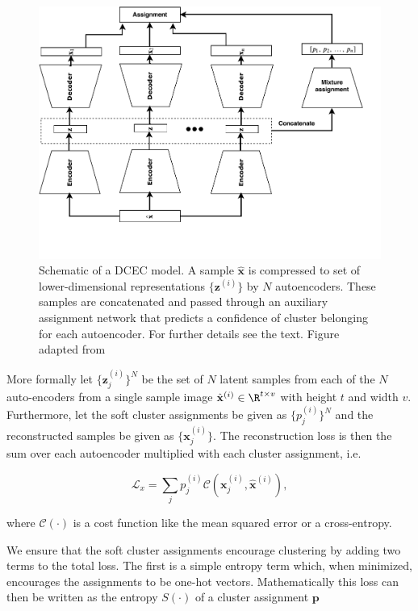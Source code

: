 \begin{figure}[tb]
	\centering
	\includegraphics[width=\textwidth]{plots/mixae.pdf}
	\caption[Deep convolutional embedded clustering schematic]{Schematic of a DCEC model. A sample $\hat{\mathbf{x}}$ is compressed to set of lower-dimensional representations $\{\mathbf{z}^{(i)}\}$ by $N$ autoencoders. These samples are concatenated and passed through an auxiliary assignment network that predicts a confidence of cluster belonging for each autoencoder. For further details see the text. Figure adapted from \citet{Zhang}}
	\label{fig:mixae}
\end{figure}


More formally let $\{\mathbf{z}_j^{(i)}\}^N$ be the set of $N$ latent samples from each of the $N$ auto-encoders from a single sample image $\hat{\mathbf{x}}^{(i)} \in \R ^{t\times v}$ with height $t$ and width $v$. Furthermore, let the soft cluster assignments be given as $\{p_j^{(i)}\}^N$ and the reconstructed samples be given as $\{\mathbf{x}_j^{(i)}\}$. The reconstruction loss is then the sum over each autoencoder multiplied with each cluster assignment, i.e.

\begin{equation}\label{eq:mixae_reconst}
\mathcal{L}_x = \sum_j p_j^{(i)} \mathcal{C}(\mathbf{x}_j^{(i)}, \hat{\mathbf{x}}^{(i)}),
\end{equation}

\noindent where $\mathcal{C}(\cdot)$ is a cost function like the mean squared error or a cross-entropy.

We ensure that the soft cluster assignments encourage clustering by adding two terms to the total loss. The first is a simple entropy term which, when minimized, encourages the assignments to be one-hot vectors. Mathematically this loss can then be written as the entropy $S(\cdot)$ of a cluster assignment $\mathbf{p}$

